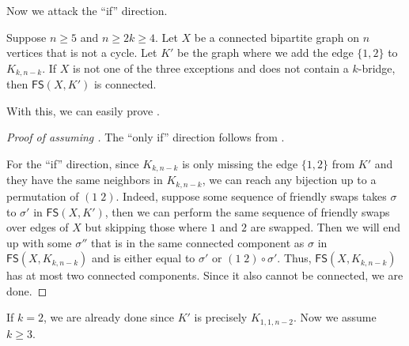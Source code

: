 \documentclass{mystyle}
\newcommand{\FS}{\mathsf{FS}}
\begin{document}
Now we attack the ``if'' direction. 
\begin{theorem}\label{thm_K'}
    Suppose $n \geq 5$ and $n \geq 2k \geq 4$. Let $X$ be a connected bipartite graph on $n$ vertices that is not a cycle. Let $K'$ be the graph where we add the edge $\{1, 2\}$ to $K_{k, n - k}$. If $X$ is not one of the three exceptions and does not contain a $k$-bridge, then $\FS(X, K')$ is connected. 
\end{theorem}
With this, we can easily prove .
\begin{proof}[Proof of  assuming ]
    The ``only if'' direction follows from . 
    
    For the ``if'' direction, since $K_{k, n - k}$ is only missing the edge $\{1, 2\}$ from $K'$ and they have the same neighbors in $K_{k, n - k}$, we can reach any bijection up to a permutation of $(1 \; 2)$. Indeed, suppose some sequence of friendly swaps takes $\sigma$ to $\sigma'$ in $\FS(X, K')$, then we can perform the same sequence of friendly swaps over edges of $X$ but skipping those where $1$ and $2$ are swapped. Then we will end up with some $\sigma''$ that is in the same connected component as $\sigma$ in $\FS(X, K_{k, n-k})$ and is either equal to $\sigma'$ or $(1 \; 2) \circ \sigma'$. Thus, $\FS(X, K_{k, n-k})$ has at most two connected components. Since it also cannot be connected, we are done. 
\end{proof}
If $k = 2$, we are already done since $K'$ is precisely $K_{1, 1, n - 2}$. Now we assume $k \geq 3$. 
\end{document}
